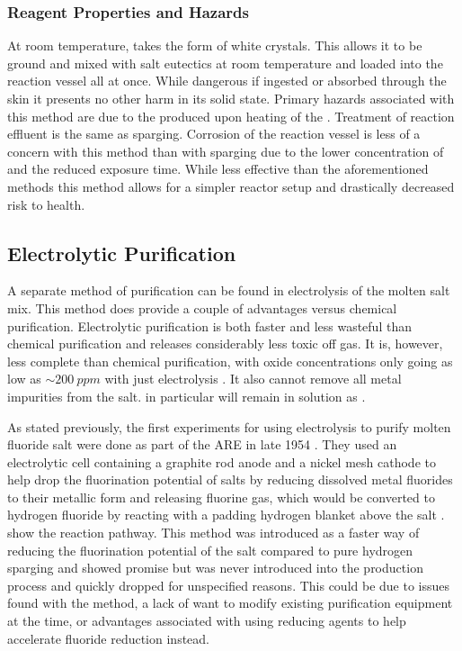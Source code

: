 \subsubsection{Reagent Properties and Hazards}
\label{sec: nf4hf2 hazards}

At room temperature,  takes the form of white crystals. This
allows it to be ground and mixed with salt eutectics at room temperature and
loaded into the reaction vessel all at once. While dangerous if ingested or
absorbed through the skin it presents no other harm in its solid state.
Primary hazards associated with this method are due to the  produced
upon heating of the . Treatment of reaction effluent is the same
as  sparging. Corrosion of the reaction vessel is less of a
concern with this method than with  sparging due to the lower
concentration of  and the reduced exposure time. While less effective
than the aforementioned methods this method allows for a simpler reactor
setup and drastically decreased risk to health. \par

\subsection{Electrolytic Purification}
\label{sec: electrolytic purification}

A separate method of purification can be found in electrolysis of the
molten salt mix. This method does provide a couple of advantages versus
chemical purification. Electrolytic purification is both faster and less
wasteful than chemical purification and releases considerably less toxic
off gas. It is, however, less complete than chemical purification, with
oxide concentrations only going as low as $\sim\SI{200}{ppm}$ with just
electrolysis \cite{rev44}. It also cannot remove all metal impurities
from the salt.  in particular will remain in solution as .
\par

As stated previously, the first experiments for using electrolysis to
purify molten fluoride salt were done as part of the ARE in late 1954
\cite{rev5}. They used an electrolytic cell containing a graphite rod
anode and a nickel mesh cathode to help drop the fluorination potential
of salts by reducing dissolved metal fluorides to their metallic form
and releasing fluorine gas, which would be converted to hydrogen
fluoride by reacting with a padding hydrogen blanket above the salt
\cite{rev5}. 
show the reaction pathway. This method was introduced as a faster way of
reducing the fluorination potential of the salt compared to pure hydrogen
sparging and showed promise but was never introduced into the production
process and quickly dropped for unspecified reasons. This could be due to
issues found with the method, a lack of want to modify existing purification
equipment at the time, or advantages associated with using reducing agents
to help accelerate fluoride reduction instead. \par

